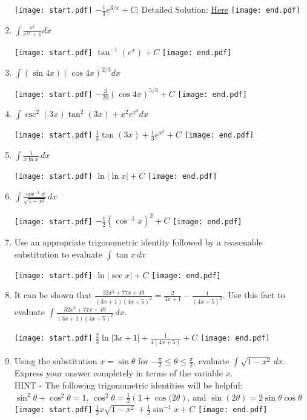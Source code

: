 \documentclass[12pt]{article}
\begin{document}
\begin{enumerate}
\texttt{[image: start.pdf]}
{{$-\frac{1}{3}e^{3/x}+C$; Detailed Solution: \textcolor{blue}{\href{http://www.math.drexel.edu/classes/Calculus/resources/Math122HW/Solutions/122_05_Substitution_16.pdf}{Here}}}}
\texttt{[image: end.pdf]}


\item $\int \frac{e^x}{e^{2x}+1}dx$ 

\texttt{[image: start.pdf]}
{{$\tan^{-1}{(e^x)}+C$}}
\texttt{[image: end.pdf]}


\item $\int (\sin{4x})(\cos{4x})^{2/3}dx$ 

\texttt{[image: start.pdf]}
{{$-\frac{3}{20}(\cos{4x})^{5/3}+C$}}
\texttt{[image: end.pdf]}


\item $\int \csc^{2}{(3x)}\tan^{2}{(3x)}+x^2e^{x^3}dx$ 

\texttt{[image: start.pdf]}
{{$\frac{1}{3}\tan{(3x)}+\frac{1}{3}e^{x^3}+C$}}
\texttt{[image: end.pdf]}


\item $\int \frac{1}{x\ln{x}} \,dx$

\texttt{[image: start.pdf]}
{{$\ln{|\ln{x}|}+C$}}
\texttt{[image: end.pdf]}


\item $\int{\frac{\cos^{-1}{x}}{\sqrt{1-x^2}}} \,dx$

\texttt{[image: start.pdf]}
{{$-\frac{1}{2}\left(\cos^{-1}{x}\right)^2+C$}}
\texttt{[image: end.pdf]}


\item Use an appropriate trigonometric identity followed by a reasonable substitution to evaluate $\int \tan{x} \,dx$

\texttt{[image: start.pdf]}
{{$\ln{|\sec{x}|}+C$}}
\texttt{[image: end.pdf]}


\item It can be shown that $\frac{32x^2+77x+49}{(3x+1)(4x+5)^2}=\frac{2}{3x+1}-\frac{1}{(4x+5)^2}$.  Use this fact to evaluate $\int{\frac{32x^2+77x+49}{(3x+1)(4x+5)^2}} \,dx$.

\texttt{[image: start.pdf]}
{{$\frac{2}{3}\ln{|3x+1|}+\frac{1}{4(4x+5)}+C$}}
\texttt{[image: end.pdf]}


\item Using the substitution $x=\sin{\theta}$ for $-\frac{\pi}{2} \leq \theta \leq \frac{\pi}{2}$, evaluate $\int{\sqrt{1-x^2}} \,dx$.  Express your answer completely in terms of the variable $x$.\\

HINT - The following trigonometric identities will be helpful:
$\sin^2{\theta}+\cos^2{\theta}=1$, $\cos^{2}{\theta}=\frac{1}{2}(1+\cos{(2\theta})$, and $\sin{(2\theta)}=2\sin{\theta}\cos{\theta}$\\

\texttt{[image: start.pdf]}
{{$\frac{1}{2}x\sqrt{1-x^2}+\frac{1}{2}\sin^{-1}{x}+C$}}
\texttt{[image: end.pdf]}


\end{enumerate}
\end{document}
